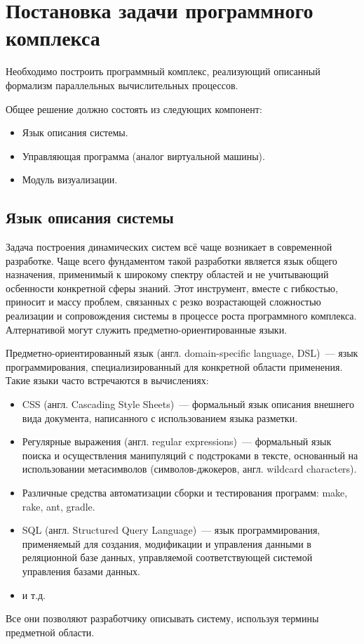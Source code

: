 \section{Постановка задачи программного комплекса}

Необходимо построить программный комплекс, реализующий описанный формализм параллельных вычислительных процессов.

Общее решение должно состоять из следующих компонент:
\begin{itemize}
	\item Язык описания системы.
	\item Управляющая программа (аналог виртуальной машины).
	\item Модуль визуализации.
\end{itemize}


\subsection{Язык описания системы}
Задача построения динамических систем всё чаще возникает в современной разработке. 
Чаще всего фундаментом такой разработки является язык общего назначения, применимый к широкому спектру областей и не учитывающий осбенности конкретной сферы знаний.
Этот инструмент, вместе с гибкостью, приносит и массу проблем, связанных с резко возрастающей сложностью реализации и сопровождения системы в процессе роста программного комплекса.
Алтернативой могут служить предметно-ориентированные языки.

Предметно-ориентированный язык (англ. domain-specific language, DSL)~--- язык программирования, специализированный для конкретной области применения.
Такие языки часто встречаются в вычислениях:
\begin{itemize}
	\item CSS (англ. Cascading Style Sheets)~--- формальный язык описания внешнего вида документа, написанного с использованием языка разметки.
	\item Регулярные выражения (англ. regular expressions)~--- формальный язык поиска и осуществления манипуляций с подстроками в тексте, основанный на использовании метасимволов (символов-джокеров, англ. wildcard characters).
	\item Различные средства автоматизации сборки и тестирования программ: make, rake, ant, gradle.
	\item SQL (англ. Structured Query Language)~--- язык программирования, применяемый для создания, модификации и управления данными в реляционной базе данных, управляемой соответствующей системой управления базами данных.
	\item и т.д.
\end{itemize}
Все они позволяют разработчику описывать систему, используя термины предметной области.

